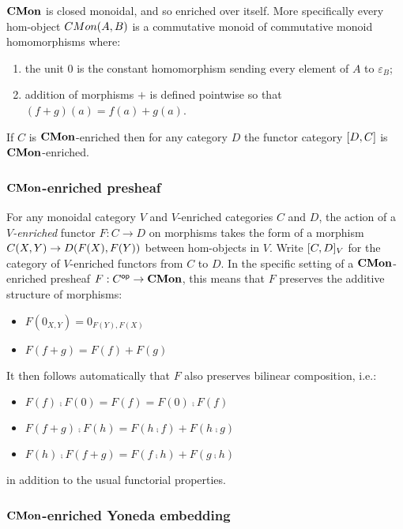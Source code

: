 $\mathbf{CMon}$ is closed monoidal, and so enriched over itself. More specifically every hom-object ${CMon}(A,B)$
is a commutative monoid of commutative monoid homomorphisms where:

\begin{enumerate}
\item the unit $0$ is the constant homomorphism sending every element of $A$ to $\varepsilon_B$;
\item addition of morphisms $+$ is defined pointwise so that $(f + g)(a) = f(a) + g(a)$.
\end{enumerate}

\begin{proposition}
If $C$ is $\mathbf{CMon}$-enriched then for any category $D$ the functor category $[D,C]$ is $\mathbf{CMon}$-enriched.
\end{proposition}

\subsubsection{$\mathbf{CMon}$-enriched presheaf}

For any monoidal category $V$ and $V$-enriched categories $C$ and $D$, the action of a \emph{$V$-enriched}
functor $F: C \to D$ on morphisms takes the form of a morphism ${C}(X,Y) \to {D}(F(X),F(Y))$ between
hom-objects in $V$. Write $[C,D]_V$ for the category of $V$-enriched functors from $C$ to $D$. In the
specific setting of a $\mathbf{CMon}$-enriched presheaf $F: C^{\mathsf{op}} \to \mathbf{CMon}$, this means that $F$ preserves the
additive structure of morphisms:
\begin{itemize}
\item $F(0_{X,Y}) = 0_{F(Y),F(X)}$
\item $F(f + g) = F(f) + F(g)$
\end{itemize}
It then follows automatically that $F$ also preserves bilinear composition, i.e.:
\begin{itemize}
\item $F(f) \comp F(0) = F(f) = F(0) \comp F(f)$
\item $F(f + g) \comp F(h) = F(h \comp f) + F(h \comp g)$
\item $F(h) \comp F(f + g) = F(f \comp h) + F(g \comp h)$
\end{itemize}
in addition to the usual functorial properties.

\subsubsection{$\mathbf{CMon}$-enriched Yoneda embedding}

